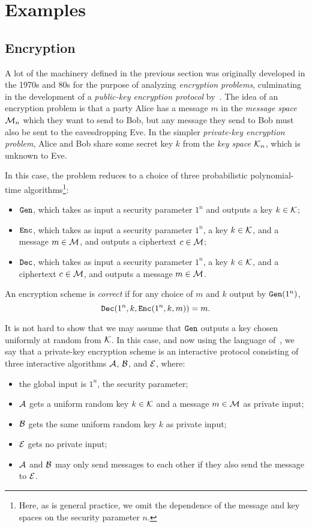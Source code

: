\section{Examples}

\subsection{Encryption}

A lot of the machinery defined in the previous section was originally developed
in the 1970s and 80s for the purpose of analyzing \emph{encryption problems},
culminating in the development of a \emph{public-key encryption protocol}
by~\cite{goldwasser-micali-1982}. The idea of an encryption problem is that a
party Alice has a message $m$ in the \emph{message space} $\mathcal{M}_n$ which they want
to send to Bob, but any message they send to Bob must also be sent to the
eavesdropping Eve. In the simpler \emph{private-key encryption problem}, Alice
and Bob share some secret key $k$ from the \emph{key space $\mathcal{K}_n$}, which is
unknown to Eve.

In this case, the problem reduces to a choice of three probabilistic
polynomial-time algorithms\footnote{Here, as is general practice, we omit the
dependence of the message and key spaces on the security parameter $n$.}:\begin{itemize}
  \item ${\texttt{Gen}}$, which takes as input a security parameter $1^n$ and
    outputs a key $k\in\mathcal{K}$;
  \item ${\texttt{Enc}}$, which takes as input a security parameter $1^n$, a key
    $k\in\mathcal{K}$, and a message $m\in\mathcal{M}$, and outputs a ciphertext $c\in\mathcal{M}$;
  \item ${\texttt{Dec}}$, which takes as input a security parameter $1^n$, a key
    $k\in\mathcal{K}$, and a ciphertext $c\in\mathcal{M}$, and outputs a message $m\in\mathcal{M}$.
\end{itemize}

An encryption scheme is \emph{correct} if for any choice of $m$ and $k$ output
by ${\texttt{Gen}}(1^n)$, \[
  {\texttt{Dec}}(1^n, k, {\texttt{Enc}}(1^n, k, m)) = m.
\]

It is not hard to show that we may assume that ${\texttt{Gen}}$ outputs a key chosen
uniformly at random from $\mathcal{K}$. In this case, and now using the language
of~, we
say that a private-key encryption scheme is an interactive protocol consisting
of three interactive algorithms $\mathcal{A}$, $\mathcal{B}$, and $\mathcal{E}$, where:
\begin{itemize}
  \item the global input is $1^n$, the security parameter;
  \item $\mathcal{A}$ gets a uniform random key $k\in\mathcal{K}$ and a message $m\in\mathcal{M}$ as private input;
  \item $\mathcal{B}$ gets the same uniform random key $k$ as private input;
  \item $\mathcal{E}$ gets no private input;
  \item $\mathcal{A}$ and $\mathcal{B}$ may only send messages to each other if they also send
    the message to $\mathcal{E}$.
\end{itemize}

